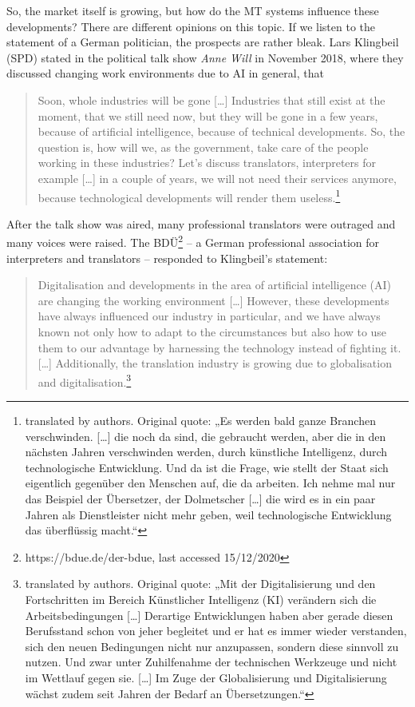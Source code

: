 So, the market itself is growing, but how do the MT systems influence these developments? There are different opinions on this topic. If we listen to the statement of a German politician, the prospects are rather bleak. Lars Klingbeil (SPD) stated in the political talk show \textit{Anne Will} in November 2018, where they discussed changing work environments due to AI in general, that 
\begin{quote}Soon, whole industries will be gone […] Industries that still exist at the moment, that we still need now, but they will be gone in a few years, because of artificial intelligence, because of technical developments. So, the question is, how will we, as the government, take care of the people working in these industries? Let’s discuss translators, interpreters for example […] in a couple of years, we will not need their services anymore, because technological developments will render them useless.\footnote{translated by authors. Original quote: „Es werden bald ganze Branchen verschwinden. […] die noch da sind, die gebraucht werden, aber die in den nächsten Jahren verschwinden werden, durch künstliche Intelligenz, durch technologische Entwicklung. Und da ist die Frage, wie stellt der Staat sich eigentlich gegenüber den Menschen auf, die da arbeiten. Ich nehme mal nur das Beispiel der Übersetzer, der Dolmetscher […] die wird es in ein paar Jahren als Dienstleister nicht mehr geben, weil technologische Entwicklung das überflüssig macht.“}\end{quote}

After the talk show was aired, many professional translators were outraged and many voices were raised. The BDÜ\footnote{https://bdue.de/der-bdue, last accessed 15/12/2020} – a German professional association for interpreters and translators – responded to Klingbeil’s statement: 
\begin{quote}Digitalisation and developments in the area of artificial intelligence (AI) are changing the working environment […] However, these developments have always influenced our industry in particular, and we have always known not only how to adapt to the circumstances but also how to use them to our advantage by harnessing the technology instead of fighting it. […] Additionally, the translation industry is growing due to globalisation and digitalisation.\footnote{translated by authors. Original quote: „Mit der Digitalisierung und den Fortschritten im Bereich Künstlicher Intelligenz (KI) verändern sich die Arbeitsbedingungen […] Derartige Entwicklungen haben aber gerade diesen Berufsstand schon von jeher begleitet und er hat es immer wieder verstanden, sich den neuen Bedingungen nicht nur anzupassen, sondern diese sinnvoll zu nutzen. Und zwar unter Zuhilfenahme der technischen Werkzeuge und nicht im Wettlauf gegen sie. […] Im Zuge der Globalisierung und Digitalisierung wächst zudem seit Jahren der Bedarf an Übersetzungen.“}\end{quote}

